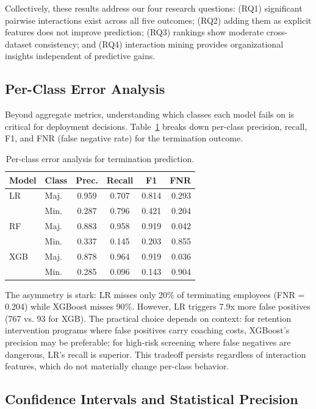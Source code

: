 \documentclass[conference]{IEEEtran}
\begin{document}
Collectively, these results address our four research questions: (RQ1) significant pairwise interactions exist across all five outcomes; (RQ2) adding them as explicit features does not improve prediction; (RQ3) rankings show moderate cross-dataset consistency; and (RQ4) interaction mining provides organizational insights independent of predictive gains.

\subsection{Per-Class Error Analysis}
\label{sec:error_analysis}

Beyond aggregate metrics, understanding which classes each model fails on is critical for deployment decisions. Table~\ref{tab:error_analysis} breaks down per-class precision, recall, F1, and FNR (false negative rate) for the termination outcome.

\begin{table}[htb]
\centering
\small
\renewcommand{\arraystretch}{1.15}
\caption{Per-class error analysis for termination prediction.}
\label{tab:error_analysis}
\begin{tabular}{llcccr}
\hline
Model & Class & Prec. & Recall & F1 & FNR \\
\hline
LR & Maj. & 0.959 & 0.707 & 0.814 & 0.293 \\
 & Min. & 0.287 & 0.796 & 0.421 & 0.204 \\
RF & Maj. & 0.883 & 0.958 & 0.919 & 0.042 \\
 & Min. & 0.337 & 0.145 & 0.203 & 0.855 \\
XGB & Maj. & 0.878 & 0.964 & 0.919 & 0.036 \\
 & Min. & 0.285 & 0.096 & 0.143 & 0.904 \\
\hline
\end{tabular}
\end{table}

The asymmetry is stark: LR misses only 20\% of terminating employees (FNR = 0.204) while XGBoost misses 90\%. However, LR triggers 7.9x more false positives (767 vs. 93 for XGB). The practical choice depends on context: for retention intervention programs where false positives carry coaching costs, XGBoost's precision may be preferable; for high-risk screening where false negatives are dangerous, LR's recall is superior. This tradeoff persists regardless of interaction features, which do not materially change per-class behavior.

\subsection{Confidence Intervals and Statistical Precision}
\end{document}
